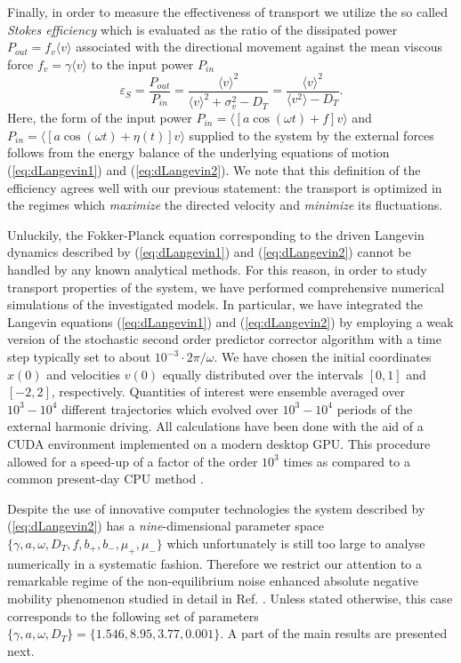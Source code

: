 \documentclass[12pt]{iopart}
\begin{document}
Finally, in order to measure the effectiveness of transport we utilize the so called \emph{Stokes efficiency} \cite{oster,MacKos2004,linke2005,spiechNJP} which 
is evaluated as the ratio of the dissipated power $P_{out} = f_v\langle v \rangle$ associated with the directional movement against the mean viscous force $f_v = \gamma \langle v \rangle$ to the input power $P_{in}$ \cite{MacKos2004}
\begin{equation}
	\varepsilon_S = \frac{P_{out}}{P_{in}} = \frac{\langle v \rangle^2}{\langle v \rangle^2 + \sigma_v^2 - D_T} = \frac{\langle v \rangle^2}{\langle v^2 \rangle - D_T}.
\end{equation}
Here, the form of the input power $P_{in}=\langle [a \cos(\omega t) +f]v\rangle$ and $P_{in}=\langle [a \cos(\omega t) +\eta(t)]v\rangle$ supplied to the system by the external 
forces follows from the energy balance of the underlying equations of motion (\ref{eq:dLangevin1}) and (\ref{eq:dLangevin2}). 
We note that this definition of the efficiency agrees well with our previous statement: the transport is optimized in the regimes which \emph{maximize} the directed velocity and \emph{minimize} its fluctuations. 

Unluckily, the Fokker-Planck equation corresponding to the driven Langevin dynamics described by (\ref{eq:dLangevin1}) and (\ref{eq:dLangevin2}) cannot be handled by any known analytical methods. For this reason, in order to study transport properties of the system,  we have performed comprehensive numerical simulations of the investigated models. In particular, we have integrated the Langevin equations (\ref{eq:dLangevin1}) and (\ref{eq:dLangevin2}) by employing a weak version of the stochastic second order predictor corrector algorithm with a time step typically set to about $10^{-3} \cdot 2\pi/\omega$. We have chosen the initial coordinates $x(0)$ and velocities $v(0)$ equally distributed over the intervals $[0,1]$ and $[-2,2]$, respectively. Quantities of interest were ensemble averaged over $10^3 - 10^4$ different trajectories which evolved over $10^3 - 10^4$ periods of the external harmonic driving. All calculations have been done with the aid of a CUDA environment implemented on a modern desktop GPU. This procedure allowed for a speed-up of a factor of the order $10^{3}$ times as compared to a common present-day CPU method \cite{spiechCPC}.

Despite the use of innovative computer technologies the system described by (\ref{eq:dLangevin2}) has a \emph{nine}-dimensional parameter space $\{\gamma, a, \omega, D_T, f, b_+, b_-, \mu_+, \mu_-\}$ which unfortunately is still too large to analyse numerically in a systematic fashion. Therefore we restrict our attention to a remarkable regime of the non-equilibrium noise enhanced absolute negative mobility phenomenon studied in detail in Ref. \cite{spiechPRE}. Unless stated otherwise, this case corresponds to the following set of parameters $\{\gamma, a, \omega, D_T\} = \{1.546, 8.95, 3.77, 0.001\}$. A part of the main results are presented next.
\end{document}
